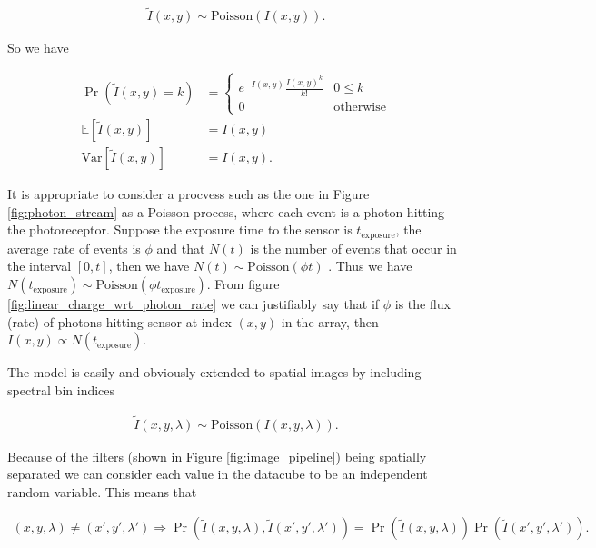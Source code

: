 \documentclass[12pt,twoside,notitlepage]{report}
\newcommand{\var}{\text{Var}}
\newcommand{\bb}[1]{\mathbb{#1}}
\begin{document}
        \begin{align}
            \tilde{I}(x,y) \sim \text{Poisson}(I(x,y)).
        \end{align}

        So we have

        \begin{align}
            \Pr(\tilde{I}(x,y) = k) & = 
                \begin{cases}
                    e^{-I(x,y)} \frac{I(x,y)^k}{k!} & 0 \leq k              \label{eq:image_poisson} \\
                    0 & \text{otherwise}
                \end{cases} \\
            \bb{E}\left[ \tilde{I}(x,y) \right] & = I(x,y) \\
            \var\left[ \tilde{I}(x,y) \right] & = I(x,y).                 
        \end{align}

        It is appropriate to consider a procvess such as the one in Figure \ref{fig:photon_stream} as a Poisson process, where 
        each event is a photon hitting the photoreceptor. Suppose the exposure time to the sensor is 
        $t_{\text{exposure}}$, the average rate of events is $\phi$ and that $N(t)$ is the number of events that 
        occur in the interval $[0,t]$, then we have $N(t) \sim \text{Poisson}(\phi t)$ \cite{ross2002probability}. 
        Thus we have $N(t_{\text{exposure}}) \sim \text{Poisson}(\phi t_{\text{exposure}})$. From figure 
        \ref{fig:linear_charge_wrt_photon_rate} we can justifiably say that if $\phi$ is the flux (rate) of 
        photons hitting sensor at index $(x,y)$ in the array, then $I(x,y) \propto N(t_{\text{exposure}})$.
        
        The model is easily and obviously extended to spatial images by including spectral bin indices 

        \begin{align}
            \tilde{I}(x,y,\lambda) \sim \text{Poisson}(I(x,y,\lambda)).
        \end{align}

        Because of the filters (shown in Figure \ref{fig:image_pipeline}) being spatially separated we can consider 
        each value in the datacube to be an independent random variable. This means that 

        \begin{align}
            (x,y,\lambda) \neq (x',y',\lambda') \Rightarrow 
                  \Pr(\tilde{I}(x,y,\lambda), \tilde{I}(x',y',\lambda')) = \Pr(\tilde{I}(x,y,\lambda)) \Pr(\tilde{I}(x',y',\lambda')).
        \end{align}
\end{document}
